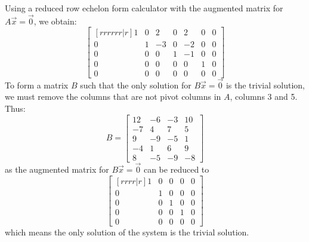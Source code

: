 \documentclass[11pt]{scrartcl}
\theoremstyle{dotlessP}
\theoremstyle{dotlessN}
\begin{document}
Using a reduced row echelon form calculator with the augmented matrix for  $A \vec{x} = \vec{0}$, we obtain:
\[
\begin{bmatrix}[rrrrrr|r]
	1 & 0 & 2 & 0 & 2 & 0 & 0 \\
	0 & 1 & -3 & 0 & -2 & 0 & 0 \\
	0 & 0 & 0 & 1 & -1 & 0 & 0 \\
	0 & 0 & 0 & 0 & 0 & 1 & 0 \\
	0 & 0 & 0 & 0 & 0 & 0 & 0 
\end{bmatrix}
\] 
To form a matrix $B$ such that the only solution for $B \vec{x} = \vec{0}$ is the trivial solution, we must remove the columns that are not pivot columns in $A$, columns 3 and 5. Thus:
 \[
B = 
\begin{bmatrix}
	12 & -6 & -3 & 10 \\
	-7 & 4 & 7 & 5 \\
	9 & -9 & -5 & 1 \\
	-4 & 1 & 6 & 9 \\
 	8 & -5 & -9 & -8	
\end{bmatrix}
\]
as the augmented matrix for $B \vec{x} = \vec{0}$ can be reduced to 
\[
\begin{bmatrix}[rrrr|r]
	1 & 0 & 0 & 0 & 0 \\
	0 & 1 & 0 & 0 & 0 \\
	0 & 0 & 1 & 0 & 0 \\
	0 & 0 & 0 & 1 & 0 \\
	0 & 0 & 0 & 0 & 0
\end{bmatrix}
\] 
which means the only solution of the system is the trivial solution.
\end{document}
